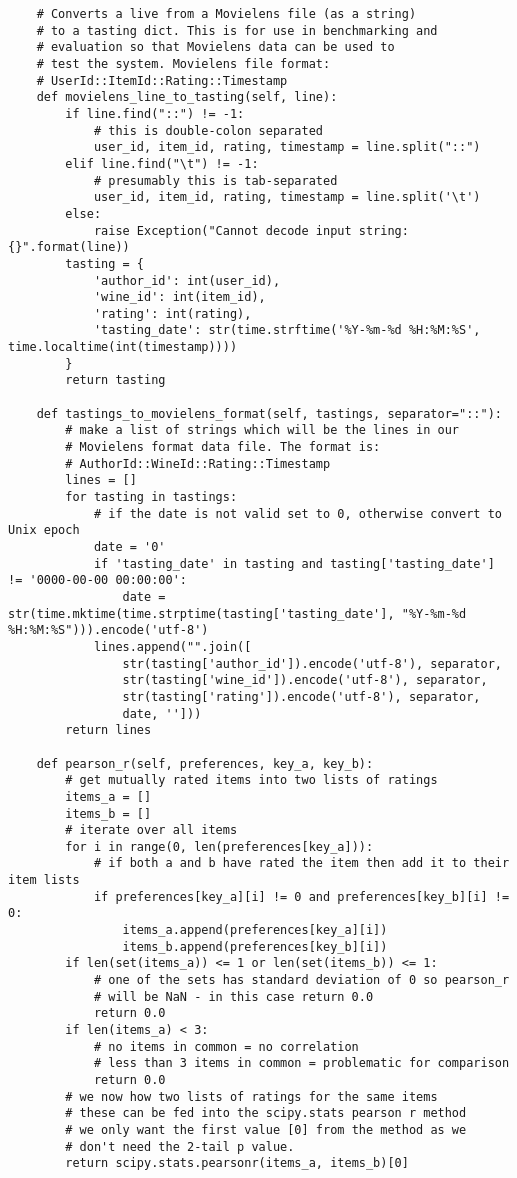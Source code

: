 \begin{verbatim}
    # Converts a live from a Movielens file (as a string)
    # to a tasting dict. This is for use in benchmarking and
    # evaluation so that Movielens data can be used to 
    # test the system. Movielens file format:
    # UserId::ItemId::Rating::Timestamp
    def movielens_line_to_tasting(self, line):
        if line.find("::") != -1:
            # this is double-colon separated
            user_id, item_id, rating, timestamp = line.split("::")
        elif line.find("\t") != -1:
            # presumably this is tab-separated
            user_id, item_id, rating, timestamp = line.split('\t')
        else:
            raise Exception("Cannot decode input string: {}".format(line))
        tasting = {
            'author_id': int(user_id),
            'wine_id': int(item_id),
            'rating': int(rating),
            'tasting_date': str(time.strftime('%Y-%m-%d %H:%M:%S', time.localtime(int(timestamp))))
        }
        return tasting   

    def tastings_to_movielens_format(self, tastings, separator="::"):
        # make a list of strings which will be the lines in our 
        # Movielens format data file. The format is:
        # AuthorId::WineId::Rating::Timestamp
        lines = []
        for tasting in tastings:
            # if the date is not valid set to 0, otherwise convert to Unix epoch
            date = '0'
            if 'tasting_date' in tasting and tasting['tasting_date'] != '0000-00-00 00:00:00':
                date = str(time.mktime(time.strptime(tasting['tasting_date'], "%Y-%m-%d %H:%M:%S"))).encode('utf-8')
            lines.append("".join([
                str(tasting['author_id']).encode('utf-8'), separator, 
                str(tasting['wine_id']).encode('utf-8'), separator, 
                str(tasting['rating']).encode('utf-8'), separator, 
                date, '']))
        return lines

    def pearson_r(self, preferences, key_a, key_b):
        # get mutually rated items into two lists of ratings
        items_a = []
        items_b = []
        # iterate over all items
        for i in range(0, len(preferences[key_a])):
            # if both a and b have rated the item then add it to their item lists
            if preferences[key_a][i] != 0 and preferences[key_b][i] != 0:
                items_a.append(preferences[key_a][i])
                items_b.append(preferences[key_b][i])
        if len(set(items_a)) <= 1 or len(set(items_b)) <= 1:
            # one of the sets has standard deviation of 0 so pearson_r
            # will be NaN - in this case return 0.0
            return 0.0
        if len(items_a) < 3:
            # no items in common = no correlation
            # less than 3 items in common = problematic for comparison
            return 0.0
        # we now how two lists of ratings for the same items
        # these can be fed into the scipy.stats pearson r method
        # we only want the first value [0] from the method as we
        # don't need the 2-tail p value.
        return scipy.stats.pearsonr(items_a, items_b)[0]


\end{verbatim}
